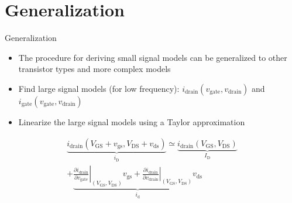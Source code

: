 \section{Generalization}
\begin{frame}{Generalization}
    \begin{itemize}
        \item The procedure for deriving small signal models can be generalized to other 
        transistor types and more complex models
        \item Find large signal models (for low frequency): 
        $i_{\mathrm{drain}}(v_{\mathrm{gate}}, v_{\mathrm{drain}})$ and 
        $i_{\mathrm{gate}}(v_{\mathrm{gate}}, v_{\mathrm{drain}})$
        \item Linearize the large signal models using a Taylor approximation
    \end{itemize}
    \begin{align*}
        \underbrace{ i_{\mathrm{drain}}(V_{\mathrm{GS}}+v_{\mathrm{gs}},
        V_{\mathrm{DS}}+v_{\mathrm{ds}}) }_{ i_{\mathrm{D}} }\simeq \underbrace{ i_{\mathrm{drain}}
        (V_{\mathrm{GS}},V_{\mathrm{DS}}) }_{ I_{\mathrm{D}} } \\
        +\underbrace{ \left.\frac{\partial i_{\mathrm{drain}}}{\partial v_{\mathrm{gate}}}\right|
        _{(V_{\mathrm{GS}},V_{\mathrm{DS}})} v_{\mathrm{gs}}
        + \left. \frac{\partial i_{\mathrm{drain}}}{\partial v_{\mathrm{drain}}} \right|
        _{(V_{\mathrm{GS}},V_{\mathrm{DS}})} v_{\mathrm{ds}}}_{ i_{\mathrm{d}} } \\
    \end{align*}
\end{frame}